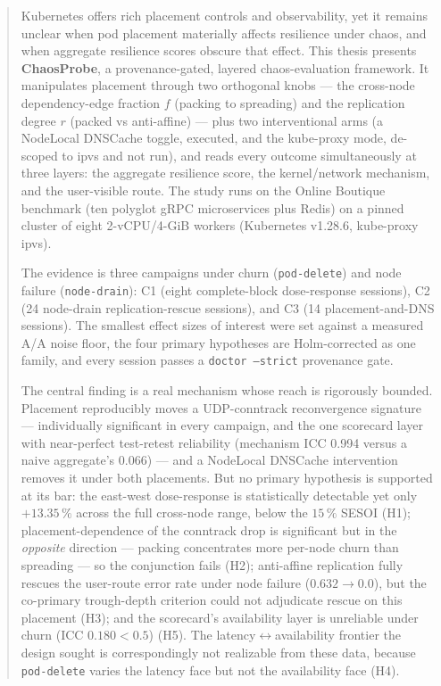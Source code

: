 \documentclass[11pt,a4paper]{report}
\begin{document}
\begin{abstract}
Kubernetes offers rich placement controls and observability, yet it remains
unclear when pod placement materially affects resilience under chaos, and when
aggregate resilience scores obscure that effect. This thesis presents
\textbf{ChaosProbe}, a provenance-gated, layered chaos-evaluation
framework. It manipulates placement through two orthogonal knobs --- the
cross-node dependency-edge fraction $f$ (packing to spreading) and the
replication degree $r$ (packed vs anti-affine) --- plus two interventional arms
(a NodeLocal DNSCache toggle, executed, and the kube-proxy mode, de-scoped to
ipvs and not run), and reads every outcome
simultaneously at three layers: the aggregate resilience score, the
kernel/network mechanism, and the user-visible route. The study runs on the
Online Boutique benchmark (ten polyglot gRPC microservices plus Redis) on a
pinned cluster of eight 2-vCPU/4-GiB workers (Kubernetes v1.28.6, kube-proxy
ipvs).

The evidence is three campaigns under churn (\texttt{pod-delete})
and node failure (\texttt{node-drain}): C1 (eight complete-block dose-response
sessions), C2 (24 node-drain replication-rescue sessions), and C3 (14
placement-and-DNS sessions). The smallest effect sizes of interest were set
against a measured A/A noise floor, the four primary hypotheses are
Holm-corrected as one family, and every session passes a \texttt{doctor
--strict} provenance gate.

The central finding is a real mechanism whose reach is rigorously bounded.
Placement reproducibly moves a UDP-conntrack reconvergence signature ---
individually significant in every campaign, and the one scorecard layer with
near-perfect test-retest reliability (mechanism ICC 0.994 versus a naive
aggregate's 0.066) --- and a NodeLocal DNSCache intervention removes it under
both placements. But no primary hypothesis is supported at its
bar: the east-west dose-response is statistically detectable yet only
$+13.35\,\%$ across the full cross-node range, below the $15\,\%$ SESOI (H1);
placement-dependence of the conntrack drop is significant but in the
\emph{opposite} direction --- packing concentrates more per-node churn than
spreading --- so the conjunction fails (H2); anti-affine replication
fully rescues the user-route error rate under node failure
($0.632 \rightarrow 0.0$), but the co-primary trough-depth criterion could not
adjudicate rescue on this placement (H3); and the scorecard's availability layer
is unreliable under churn (ICC $0.180 < 0.5$) (H5). The
latency$\leftrightarrow$availability frontier the design sought is correspondingly
not realizable from these data, because \texttt{pod-delete} varies the latency
face but not the availability face (H4).


\end{abstract}
\end{document}
